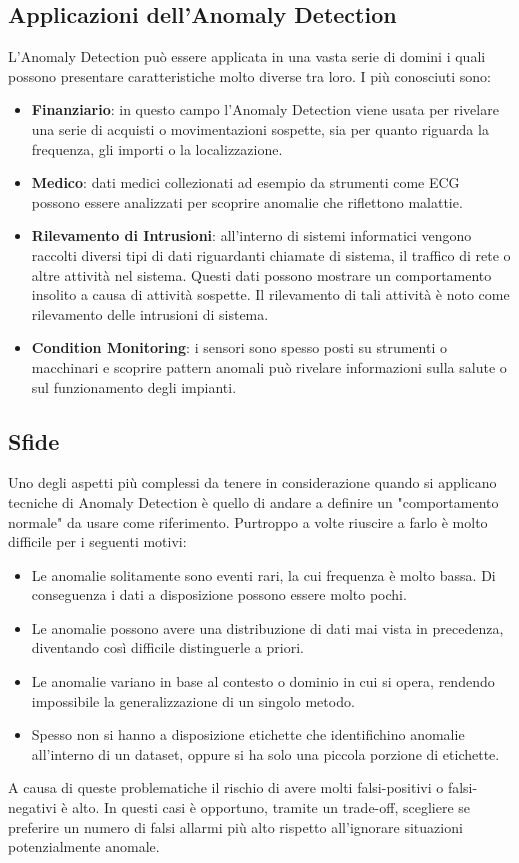 \subsection{Applicazioni dell'Anomaly Detection}
L'Anomaly Detection può essere applicata in una vasta serie di domini i quali possono presentare caratteristiche molto diverse tra loro. I più conosciuti sono:
\begin{itemize}
	\item \textbf{Finanziario}: in questo campo l'Anomaly Detection viene usata per rivelare una serie di acquisti o movimentazioni sospette, sia per quanto riguarda la frequenza, gli importi o la localizzazione.
	\item \textbf{Medico}: dati medici collezionati ad esempio da strumenti come ECG possono essere analizzati per scoprire anomalie che riflettono malattie.
	\item \textbf{Rilevamento di Intrusioni}: all'interno di sistemi informatici vengono raccolti diversi tipi di dati riguardanti chiamate di sistema, il traffico di rete o altre attività nel sistema. Questi dati possono mostrare un comportamento insolito a causa di attività sospette. Il rilevamento di tali attività è noto come rilevamento delle intrusioni di sistema.
	\item \textbf{Condition Monitoring}: i sensori sono spesso posti su strumenti o macchinari e scoprire pattern anomali può rivelare informazioni sulla salute o sul funzionamento degli impianti.
\end{itemize}

\subsection{Sfide}
Uno degli aspetti più complessi da tenere in considerazione quando si applicano tecniche di Anomaly Detection è quello di andare a definire un "comportamento normale" da usare come riferimento. Purtroppo a volte riuscire a farlo è molto difficile per i seguenti motivi:
\begin{itemize}
	\item Le anomalie solitamente sono eventi rari, la cui frequenza è molto bassa. Di conseguenza i dati a disposizione possono essere molto pochi.
	\item Le anomalie possono avere una distribuzione di dati mai vista in precedenza, diventando così difficile distinguerle a priori.
	\item Le anomalie variano in base al contesto o dominio in cui si opera, rendendo impossibile la generalizzazione di un singolo metodo.
	\item Spesso non si hanno a disposizione etichette che identifichino anomalie all'interno di un dataset, oppure si ha solo una piccola porzione di etichette.
\end{itemize}
A causa di queste problematiche il rischio di avere molti falsi-positivi o falsi-negativi è alto. In questi casi è opportuno, tramite un trade-off, scegliere se preferire un numero di falsi allarmi più alto rispetto all'ignorare situazioni potenzialmente anomale.

